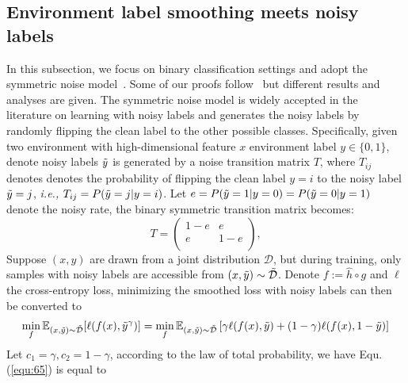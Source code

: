 \documentclass{article} \usepackage{iclr2023_conference,times}
\newcommand{\myref}[1]{Equ. (\ref{#1})}
\newcommand{\ie}[0]{\textit{i.e., }}
\begin{document}
\subsection{Environment label smoothing meets noisy labels}\label{sec:noisy..............}

In this subsection, we focus on binary classification settings and adopt the symmetric noise model~\citep{kim2019nlnl}. Some of our proofs follow~\citep{wei2021smooth} but different results and analyses are given. The symmetric noise model is widely accepted in the literature on learning with noisy labels and generates the noisy labels by randomly flipping the clean label to the other possible classes. Specifically, given two environment with high-dimensional feature $x$ environment label $y\in\{0,1\}$, denote noisy labels $\Tilde{y}$ is generated by a noise transition matrix $T$, where $T_{ij}$ denotes denotes the probability of flipping the clean label $y=i$ to the noisy label $\Tilde{y}=j$, \ie $T_{ij}=P(\Tilde{y}=j|y=i)$. Let $e=P(\Tilde{y}=1|y=0)=P(\Tilde{y}=0|y=1)$ denote the noisy rate, the binary symmetric transition matrix becomes:
\begin{equation}
T=\left(         \begin{array}{cc} 
    1-e&e \\ 
    e&1-e\\ 
  \end{array}\right),
\end{equation}
Suppose $(x,y)$ are drawn from a joint distribution $\mathcal{D}$, but during training, only samples with noisy labels are accessible from $(x,\Tilde{y})\sim\Tilde{\mathcal{D}}$. Denote $f:=\hat{h}\circ g$ and $\ell$ the cross-entropy loss, minimizing the smoothed loss with noisy labels can then be converted to
\begin{equation}
\begin{aligned}
\min_f \mathbb{E}_{(x,\Tilde{y})\sim\Tilde{\mathcal{D}}}[\ell(f(x),\Tilde{y}^\gamma)]=\min_{f}\mathbb{E}_{(x,\Tilde{y})\sim\Tilde{\mathcal{D}}}\left[\gamma\ell(f(x), \Tilde{y})+(1-\gamma)\ell(f(x), 1-\Tilde{y})\right]
\end{aligned}
\label{equ:65}
\end{equation}
Let $c_1=\gamma, c_2=1-\gamma$, according to the law of total probability, we have \myref{equ:65} is equal to
\end{document}
